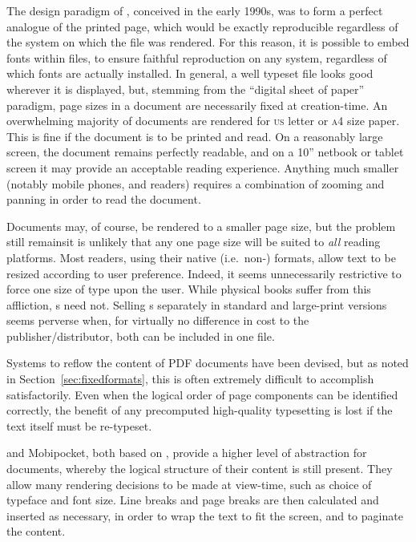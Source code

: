 The design paradigm of \pdf{}, conceived in the early 1990s,\hspace{0pt}\cite{Warnock1991} was to form a perfect analogue of the printed page, which would be exactly reproducible regardless of the system on which the file was rendered. For this reason, it is possible to embed fonts within \pdf{} files, to ensure faithful reproduction on any system, regardless of which fonts are actually installed. In general, a well typeset \pdf{} file looks good wherever it is displayed, but, stemming from the ``digital sheet of paper'' paradigm, page sizes in a \pdf{} document are necessarily fixed at creation-time. An overwhelming majority of \pdf{} documents are rendered for  \textsc{us} letter or \textsc{a}4 size paper. This is fine if the document is to be printed and read. On a reasonably large screen, the document remains perfectly readable, and on a 10'' netbook or tablet screen it may provide an acceptable reading experience. Anything much smaller (notably mobile phones, and \ebook{} readers) requires a combination of zooming and panning  in order to read the document.

Documents may, of course, be rendered to a smaller page size, but the problem still remains\ed it is unlikely that any one page size will be suited to \emph{all} reading platforms. Most \ebook{} readers, using their native (i.e.\ non-\pdf{}) formats, allow text to be resized according to user preference. Indeed, it seems unnecessarily restrictive to force one size of type upon the user. While physical books suffer from this affliction, \ebook{}s need not. Selling \ebook{}s separately in standard and large-print versions seems perverse when, for virtually no difference in cost to the publisher/distributor, both can be included in one file.

Systems to reflow the content of PDF documents have been devised,\hspace{0pt}\cite{Lovegrove1995,Marinai2013} but as noted in Section~\ref{sec:fixedformats}, this is often extremely difficult to accomplish satisfactorily. Even when the logical order of page components can be identified correctly, the benefit of any precomputed high-quality typesetting is lost if the text itself must be re-typeset.



\epub{} and Mobipocket, both based on \html{}, provide a higher level of abstraction for documents, whereby the logical structure of their content is still present. They allow many rendering decisions to be made at view-time, such as choice of typeface and font size. Line breaks and page breaks are then calculated and inserted as necessary, in order to wrap the text to fit the screen, and to paginate the content.

